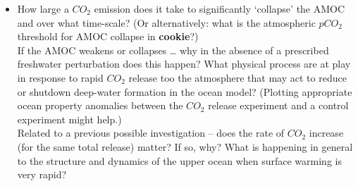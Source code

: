 \begin{itemize}[noitemsep]
\vspace{1mm}
All your \(CO_{2}\) emissions experiments to date have had this feedback enabled -- specified at the top of the \textit{user-config} file by:
\vspace{-2pt}\small\begin{verbatim}
# set climate feedback
ea_36=y
\end{verbatim}\normalsize\vspace{-2pt}

To quantify the role of the carbon-climate feedback, you need to run an identical emissions experiment, but with the feedback disabled:
\vspace{-2pt}\small\begin{verbatim}
# set climate feedback
ea_36=n
\end{verbatim}\normalsize\vspace{-2pt}

Note that you also to need to run a historical transient experiments with no carbon-climate feedback, if you are starting emissions experiments from the year 2010. i.e. you will have a set of future emissions experiments including the carbon-climate feedback that are run from a historical transient experiments that also includes carbon-climate feedback, vs. a set of future emissions experiments without the carbon-climate feedback that are run from a historical transient experiments that also \uline{does not include} carbon-climate feedback. The importance of the feedback is simply the difference between the 2 sets of experiments, at the same year.

\vspace{1mm}
\item How large a \(CO_{2}\) emission does it take to significantly ‘collapse’ the AMOC and over what time-scale? (Or alternatively: what is the atmospheric \(pCO_{2}\) threshold for AMOC collapse in \textbf{cookie}?)
\\ If the AMOC weakens or collapses … why in the absence of a prescribed freshwater perturbation does this happen? What physical process are at play in response to rapid \(CO_{2}\) release too the atmosphere that may act to reduce or shutdown deep-water formation in the ocean model? (Plotting appropriate ocean property anomalies between the \(CO_{2}\) release experiment and a control experiment might help.)
\\Related to a previous possible investigation -- does the rate of \(CO_{2}\) increase (for the same total release) matter? If so, why? What is happening in general to the structure and dynamics of the upper ocean when surface warming is very rapid?

\end{itemize}

